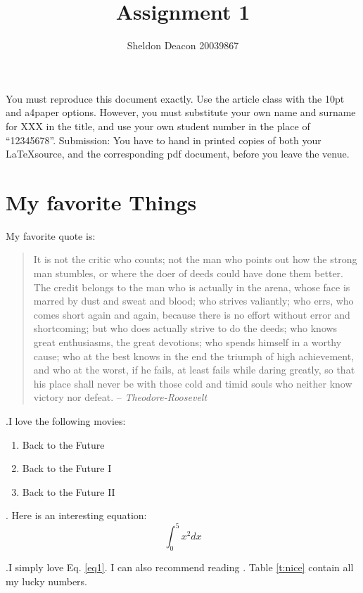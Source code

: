 \documentclass[10pt]{article} %
\author{Sheldon Deacon 20039867}
\title{Assignment 1}
\date{}
\begin{document}
\maketitle

You must reproduce this document exactly. Use the article class with the
10pt and a4paper options. However, you must substitute your own name and
surname for XXX in the title, and use your own student number in the place
of “12345678”. Submission: You have to hand in printed copies of both your
\LaTeX \space source, and the corresponding pdf document, before you leave the venue.

\section{My favorite Things}
My favorite quote is:
\begin{quote}
It is not the critic who counts; not the man who points out how
the strong man stumbles, or where the doer of deeds could have
done them better. The credit belongs to the man who is actually
in the arena, whose face is marred by dust and sweat and blood;
who strives valiantly; who errs, who comes short again and again,
because there is no effort without error and shortcoming; but who
does actually strive to do the deeds; who knows great enthusiasms,
the great devotions; who spends himself in a worthy cause; who at
the best knows in the end the triumph of high achievement, and who
at the worst, if he fails, at least fails while daring greatly, so that
his place shall never be with those cold and timid souls who neither
know victory nor defeat. -- \textit{Theodore-Roosevelt}
\end{quote}

.\newline I love the following movies:
\begin{enumerate}
\item Back to the Future
\item Back to the Future I
\item Back to the Future II
\end{enumerate}

. \newline Here is an interesting equation:
\begin{equation}
	\int_0^{5} x^{2} dx
	\label{eq1}
\end{equation}

.\newline I simply love Eq. \ref{eq1}.\newline
I can also recommend reading \cite{cohn}.\newline
Table \ref{t:nice} contain all my lucky numbers.
\end{document}
